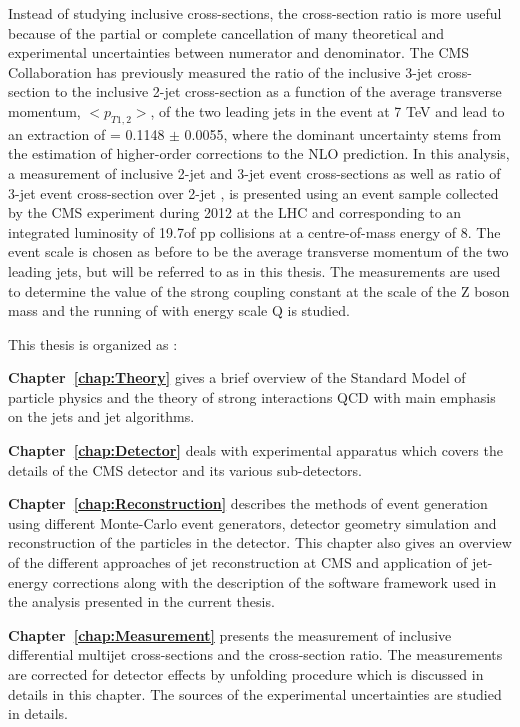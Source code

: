 Instead of studying inclusive cross-sections, the cross-section ratio is more useful because of the partial or complete cancellation of many theoretical and experimental uncertainties between numerator and denominator. The CMS Collaboration has previously measured the ratio of the inclusive 3-jet cross-section to the inclusive 2-jet cross-section as a function of the average transverse momentum, $<p_{T1,2}>$, of the two leading jets in the event at 7 TeV \cite {Chatrchyan:2013txa} and lead to an extraction of \alpsmz = 0.1148 $\pm$ 0.0055, where the dominant uncertainty stems from the estimation of higher-order corrections to the NLO prediction. In this analysis, a measurement of inclusive 2-jet and 3-jet event cross-sections as well as ratio of 3-jet event cross-section over 2-jet \ratio, is presented using an event sample collected by the CMS experiment during 2012 at the LHC and corresponding to an integrated luminosity of 19.7\fbinv of pp collisions at a centre-of-mass energy of 8\TeV. The event scale is chosen as before to be the average transverse momentum of the two leading jets, but will be referred to as \httwo in this thesis. The measurements are used to determine the value of the strong coupling constant at the scale of the Z boson mass \alpsmz and the running of \alps with energy scale Q is studied.

This thesis is organized as :

{\bf Chapter~\ref{chap:Theory}} gives a brief overview of the Standard Model of particle physics and the theory of strong interactions QCD with main emphasis on the jets and jet algorithms. 

{\bf Chapter~\ref{chap:Detector}} deals with experimental apparatus which covers the details of the CMS detector and its various sub-detectors.

{\bf Chapter~\ref{chap:Reconstruction}} describes the methods of event generation using different Monte-Carlo event generators, detector geometry simulation and reconstruction of the particles in the detector. This chapter also gives an overview of the different approaches of jet reconstruction at CMS and application of jet-energy corrections along with the description of the software framework used in the analysis presented in the current thesis.

{\bf Chapter~\ref{chap:Measurement}} presents the measurement of inclusive differential multijet cross-sections and the cross-section ratio. The measurements are corrected for detector effects by unfolding procedure which is discussed in details in this chapter. The sources of the experimental uncertainties are studied in details. 

